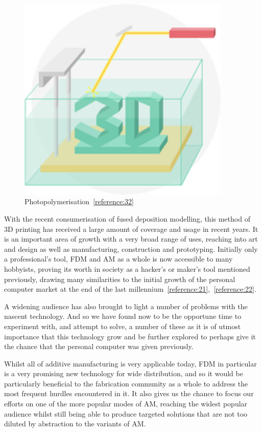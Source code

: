 \documentclass[11pt]{article} %
\begin{document}
\begin{figure}[H]
  \centering
  \includegraphics[width=4in]{sla.png}
  \caption{Photopolymerisation~\ref{reference:32}}
  \label{figure:SLA}
\end{figure}

With the recent consumerisation of fused deposition modelling, this method of 3D printing has received a large amount of coverage and usage in recent years. It is an important area of growth with a very broad range of uses, reaching into art and design as well as manufacturing, construction and prototyping. Initially only a professional's tool, FDM and AM as a whole is now accessible to many hobbyists, proving its worth in society as a hacker's or maker's tool mentioned previously, drawing many similarities to the initial growth of the personal computer market at the end of the last millennium~\ref{reference:21},~\ref{reference:22}.

A widening audience has also brought to light a number of problems with the nascent technology. And so we have found now to be the opportune time to experiment with, and attempt to solve, a number of these as it is of utmost importance that this technology grow and be further explored to perhaps give it the chance that the personal computer was given previously.

Whilst all of additive manufacturing is very applicable today, FDM in particular is a very promising new technology for wide distribution, and so it would be particularly beneficial to the fabrication community as a whole to address the most frequent hurdles encountered in it. It also gives us the chance to focus our efforts on one of the more popular modes of AM, reaching the widest popular audience whilst still being able to produce targeted solutions that are not too diluted by abstraction to the variants of AM.
\end{document}
